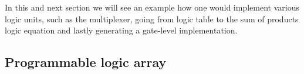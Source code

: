             In this and next section we will see an example how one would implement various logic units, such as the multiplexer, going from logic table to the sum of products logic equation and lastly generating a gate-level implementation.
            
              
            
            
        
        \subsection{Programmable logic array}